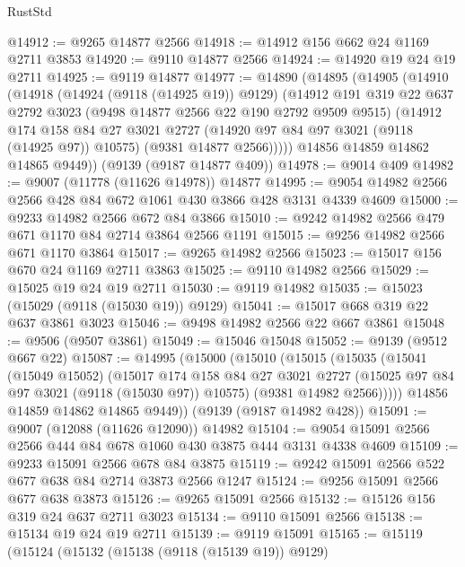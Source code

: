 \begin{lexlean}{RustStd}
\begin{coremodule}
@14912 := @9265 @14877 @2566
@14918 := @14912 @156 @662 @24 @1169 @2711 @3853
@14920 := @9110 @14877 @2566
@14924 := @14920 @19 @24 @19 @2711
@14925 := @9119 @14877
@14977 := @14890
    (@14895
      (@14905
        (@14910
          (@14918
            (@14924 (@9118 (@14925 @19)) @9129)
            (@14912
              @191
              @319
              @22
              @637
              @2792
              @3023
              (@9498 @14877 @2566 @22 @190 @2792 @9509 @9515)
              (@14912
                @174
                @158
                @84
                @27
                @3021
                @2727
                (@14920 @97 @84 @97 @3021 (@9118 (@14925 @97)) @10575)
                (@9381 @14877 @2566)))))
        @14856
        @14859
        @14862
        @14865
        @9449))
    (@9139 (@9187 @14877 @409))
@14978 := @9014 @409
@14982 := @9007 (@11778 (@11626 @14978)) @14877
@14995 := @9054 @14982 @2566 @2566 @428 @84 @672 @1061 @430 @3866 @428 @3131 @4339 @4609
@15000 := @9233 @14982 @2566 @672 @84 @3866
@15010 := @9242 @14982 @2566 @479 @671 @1170 @84 @2714 @3864 @2566 @1191
@15015 := @9256 @14982 @2566 @671 @1170 @3864
@15017 := @9265 @14982 @2566
@15023 := @15017 @156 @670 @24 @1169 @2711 @3863
@15025 := @9110 @14982 @2566
@15029 := @15025 @19 @24 @19 @2711
@15030 := @9119 @14982
@15035 := @15023 (@15029 (@9118 (@15030 @19)) @9129)
@15041 := @15017 @668 @319 @22 @637 @3861 @3023
@15046 := @9498 @14982 @2566 @22 @667 @3861
@15048 := @9506 (@9507 @3861)
@15049 := @15046 @15048
@15052 := @9139 (@9512 @667 @22)
@15087 := @14995
    (@15000
      (@15010
        (@15015
          (@15035
            (@15041
              (@15049 @15052)
              (@15017
                @174
                @158
                @84
                @27
                @3021
                @2727
                (@15025 @97 @84 @97 @3021 (@9118 (@15030 @97)) @10575)
                (@9381 @14982 @2566)))))
        @14856
        @14859
        @14862
        @14865
        @9449))
    (@9139 (@9187 @14982 @428))
@15091 := @9007 (@12088 (@11626 @12090)) @14982
@15104 := @9054 @15091 @2566 @2566 @444 @84 @678 @1060 @430 @3875 @444 @3131 @4338 @4609
@15109 := @9233 @15091 @2566 @678 @84 @3875
@15119 := @9242 @15091 @2566 @522 @677 @638 @84 @2714 @3873 @2566 @1247
@15124 := @9256 @15091 @2566 @677 @638 @3873
@15126 := @9265 @15091 @2566
@15132 := @15126 @156 @319 @24 @637 @2711 @3023
@15134 := @9110 @15091 @2566
@15138 := @15134 @19 @24 @19 @2711
@15139 := @9119 @15091
@15165 := @15119
    (@15124
      (@15132
        (@15138 (@9118 (@15139 @19)) @9129)

\end{coremodule}
\end{lexlean}
